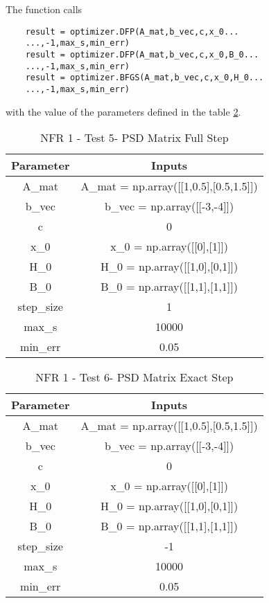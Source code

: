 \documentclass[12pt, titlepage]{article}
\begin{document}
The function calls 
\begin{lstlisting}
    result = optimizer.DFP(A_mat,b_vec,c,x_0...
    ...,-1,max_s,min_err)
    result = optimizer.DFP(A_mat,b_vec,c,x_0,B_0...
    ...,-1,max_s,min_err)    
    result = optimizer.BFGS(A_mat,b_vec,c,x_0,H_0...
    ...,-1,max_s,min_err)
\end{lstlisting}
with the value of the parameters defined in the table \ref{tbl_NFR1T6}.

\begin{table}[ht]
\caption{NFR 1 - Test 5- PSD Matrix Full Step} \label{tbl_NFR1T5}
\vspace*{2mm}
\centering
 \begin{tabular}{|c|c|} 
 \hline
\textbf{Parameter} & \textbf{Inputs} \\ 
\hline
A\_mat&  A\_mat = np.array([[1,0.5],[0.5,1.5]])   \\
 \hline
 b\_vec& b\_vec = np.array([[-3,-4]])  \\ 
 \hline
 c& 0  \\ 
 \hline
 x\_0& x\_0 = np.array([[0],[1]]) \\ 
 \hline
 H\_0& H\_0 = np.array([[1,0],[0,1]])\\ 
 \hline
 B\_0& B\_0 = np.array([[1,1],[1,1]]) \\ 
 \hline
 step\_size& 1  \\ 
 \hline
 max\_s& 10000 \\ 
 \hline
 min\_err& 0.05  \\ 
 \hline
 
\end{tabular}
\end{table}

\begin{table}[ht]
\caption{NFR 1 - Test 6- PSD Matrix Exact Step} \label{tbl_NFR1T6}
\vspace*{2mm}
\centering
 \begin{tabular}{|c|c|} 
 \hline
\textbf{Parameter} & \textbf{Inputs} \\ 
\hline
A\_mat&  A\_mat = np.array([[1,0.5],[0.5,1.5]])   \\
 \hline
 b\_vec& b\_vec = np.array([[-3,-4]])  \\ 
 \hline
 c& 0  \\ 
 \hline
 x\_0& x\_0 = np.array([[0],[1]]) \\ 
 \hline
 H\_0& H\_0 = np.array([[1,0],[0,1]])\\ 
 \hline
 B\_0& B\_0 = np.array([[1,1],[1,1]]) \\ 
 \hline
 step\_size& -1  \\ 
 \hline
 max\_s& 10000 \\ 
 \hline
 min\_err& 0.05  \\ 
 \hline
 
\end{tabular}
\end{table}
\end{document}
